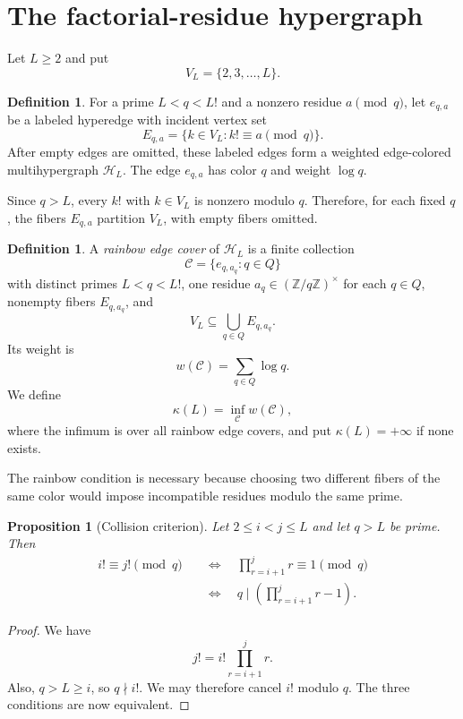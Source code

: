 \documentclass[11pt]{amsart}
\newtheorem{proposition}[theorem]{Proposition}
\theoremstyle{definition}
\newtheorem{definition}[theorem]{Definition}
\theoremstyle{remark}
\begin{document}
\section{The factorial-residue hypergraph}

Let $L\geq2$ and put
\[
V_L=\{2,3,\ldots,L\}.
\]

\begin{definition}\label{def:fibres}
For a prime $L<q<L!$ and a nonzero residue $a\pmod q$, let $e_{q,a}$ be a
labeled hyperedge with incident vertex set
\[
E_{q,a}=\{k\in V_L:k!\equiv a\pmod q\}.
\]
After empty edges are omitted, these labeled edges form a weighted
edge-colored multihypergraph $\mathcal H_L$.  The edge $e_{q,a}$ has color
$q$ and weight $\log q$.
\end{definition}

Since $q>L$, every $k!$ with $k\in V_L$ is nonzero modulo $q$.  Therefore,
for each fixed $q$, the fibers $E_{q,a}$ partition $V_L$, with empty fibers
omitted.

\begin{definition}\label{def:cover}
A \emph{rainbow edge cover} of $\mathcal H_L$ is a finite collection
\[
\mathcal C=\{e_{q,a_q}:q\in Q\}
\]
with distinct primes $L<q<L!$, one residue $a_q\in(\mathbb Z/q\mathbb Z)^\times$
for each $q\in Q$, nonempty fibers $E_{q,a_q}$, and
\[
V_L\subseteq\bigcup_{q\in Q}E_{q,a_q}.
\]
Its weight is
\[
w(\mathcal C)=\sum_{q\in Q}\log q.
\]
We define
\[
\kappa(L)=\inf_{\mathcal C}w(\mathcal C),
\]
where the infimum is over all rainbow edge covers, and put
$\kappa(L)=+\infty$ if none exists.
\end{definition}

The rainbow condition is necessary because choosing two different fibers of
the same color would impose incompatible residues modulo the same prime.

\begin{proposition}[Collision criterion]\label{prop:criterion}
Let $2\leq i<j\leq L$ and let $q>L$ be prime.  Then
\[
\begin{aligned}
i!\equiv j!\pmod q
&\quad\Longleftrightarrow\quad
\prod_{r=i+1}^{j}r\equiv1\pmod q\\
&\quad\Longleftrightarrow\quad
q\mid\left(\prod_{r=i+1}^{j}r-1\right).
\end{aligned}
\]
\end{proposition}

\begin{proof}
We have
\[
j!=i!\prod_{r=i+1}^{j}r.
\]
Also, $q>L\geq i$, so $q\nmid i!$.  We may therefore cancel $i!$ modulo
$q$.  The three conditions are now equivalent.
\end{proof}
\end{document}
